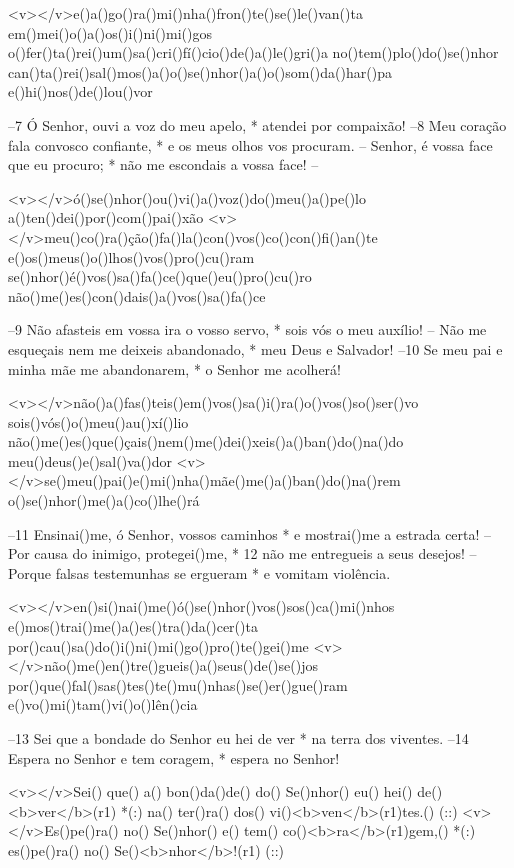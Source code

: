 <v>\VSup{}</v>e()a()go()ra()mi()nha()fron()te()se()le()van()ta
em()mei()o()a()os()i()ni()mi()gos
o()fer()ta()rei()um()sa()cri()fí()cio()de()a()le()gri()a
no()tem()plo()do()se()nhor
can()ta()rei()sal()mos()a()o()se()nhor()a()o()som()da()har()pa
e()hi()nos()de()lou()vor

–7 Ó Senhor, ouvi a voz do meu apelo, *
atendei por compaixão!
–8 Meu coração fala convosco confiante, *
e os meus olhos vos procuram.
– Senhor, é vossa face que eu procuro; *
não me escondais a vossa face! –

<v>\VSup{}</v>ó()se()nhor()ou()vi()a()voz()do()meu()a()pe()lo
a()ten()dei()por()com()pai()xão
<v>\VSup{}</v>meu()co()ra()ção()fa()la()con()vos()co()con()fi()an()te
e()os()meus()o()lhos()vos()pro()cu()ram
se()nhor()é()vos()sa()fa()ce()que()eu()pro()cu()ro
não()me()es()con()dais()a()vos()sa()fa()ce

–9 Não afasteis em vossa ira o vosso servo, *
sois vós o meu auxílio!
– Não me esqueçais nem me deixeis abandonado, *
meu Deus e Salvador!
–10 Se meu pai e minha mãe me abandonarem, *
o Senhor me acolherá!

<v>\VSup{}</v>não()a()fas()teis()em()vos()sa()i()ra()o()vos()so()ser()vo
sois()vós()o()meu()au()xí()lio
não()me()es()que()çais()nem()me()dei()xeis()a()ban()do()na()do
meu()deus()e()sal()va()dor
<v>\VSup{}</v>se()meu()pai()e()mi()nha()mãe()me()a()ban()do()na()rem
o()se()nhor()me()a()co()lhe()rá

–11 Ensinai()me, ó Senhor, vossos caminhos *
e mostrai()me a estrada certa!
– Por causa do inimigo, protegei()me, *
12 não me entregueis a seus desejos!
– Porque falsas testemunhas se ergueram *
e vomitam violência.

<v>\VSup{}</v>en()si()nai()me()ó()se()nhor()vos()sos()ca()mi()nhos
e()mos()trai()me()a()es()tra()da()cer()ta
por()cau()sa()do()i()ni()mi()go()pro()te()gei()me
<v>\VSup{}</v>não()me()en()tre()gueis()a()seus()de()se()jos
por()que()fal()sas()tes()te()mu()nhas()se()er()gue()ram
e()vo()mi()tam()vi()o()lên()cia

–13 Sei que a bondade do Senhor eu hei de ver *
na terra dos viventes.
–14 Espera no Senhor e tem coragem, *
espera no Senhor!

<v></v>Sei() que() a() bon()da()de() do() Se()nhor() eu() hei() de() <b>ver</b>(r1) *(:)
na() ter()ra() dos() vi()<b>ven</b>(r1)tes.() (::)
<v></v>Es()pe()ra() no() Se()nhor() e() tem() co()<b>ra</b>(r1)gem,() *(:)
es()pe()ra() no() Se()<b>nhor</b>!(r1) (::)